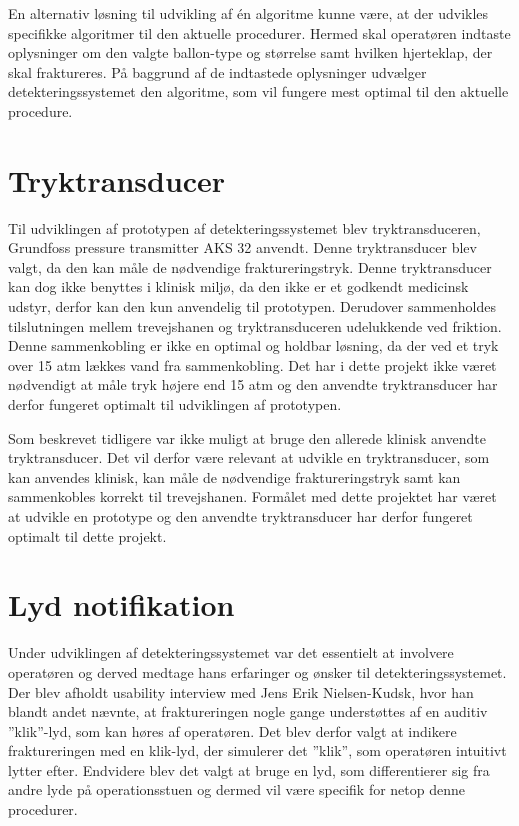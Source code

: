 En alternativ løsning til udvikling af én algoritme kunne være, at der udvikles specifikke algoritmer til den aktuelle procedurer. Hermed skal operatøren indtaste oplysninger om den valgte ballon-type og størrelse samt hvilken hjerteklap, der skal fraktureres. På baggrund af de indtastede oplysninger udvælger detekteringssystemet den algoritme, som vil fungere mest optimal til den aktuelle procedure.  

\section{Tryktransducer}
Til udviklingen af prototypen af detekteringssystemet blev tryktransduceren, Grundfoss pressure transmitter AKS 32 anvendt. Denne tryktransducer blev valgt, da den kan måle de nødvendige fraktureringstryk. Denne tryktransducer kan dog ikke benyttes i klinisk miljø, da den ikke er et godkendt medicinsk udstyr, derfor kan den kun anvendelig til prototypen. Derudover sammenholdes tilslutningen mellem trevejshanen og tryktransduceren udelukkende ved friktion. Denne sammenkobling er ikke en optimal og holdbar løsning, da der ved et tryk over 15 atm lækkes vand fra sammenkobling. Det har i dette projekt ikke været nødvendigt at måle tryk højere end 15 atm og den anvendte tryktransducer har derfor fungeret optimalt til udviklingen af prototypen.   

Som beskrevet tidligere var ikke muligt at bruge den allerede klinisk anvendte tryktransducer. Det vil derfor være relevant at udvikle en tryktransducer, som kan anvendes klinisk, kan måle de nødvendige fraktureringstryk samt kan sammenkobles korrekt til trevejshanen. Formålet med dette projektet har været at udvikle en prototype og den anvendte tryktransducer har derfor fungeret optimalt til dette projekt. 

\section{Lyd notifikation}
Under udviklingen af detekteringssystemet var det essentielt at involvere operatøren og derved medtage hans erfaringer og ønsker til detekteringssystemet. Der blev afholdt usability interview med Jens Erik Nielsen-Kudsk, hvor han blandt andet nævnte, at fraktureringen nogle gange understøttes af en auditiv ”klik”-lyd, som kan høres af operatøren. Det blev derfor valgt at indikere fraktureringen med en klik-lyd, der simulerer det ”klik”, som operatøren intuitivt lytter efter. Endvidere blev det valgt at bruge en lyd, som differentierer sig fra andre lyde på operationsstuen og dermed vil være specifik for netop denne procedurer. 

